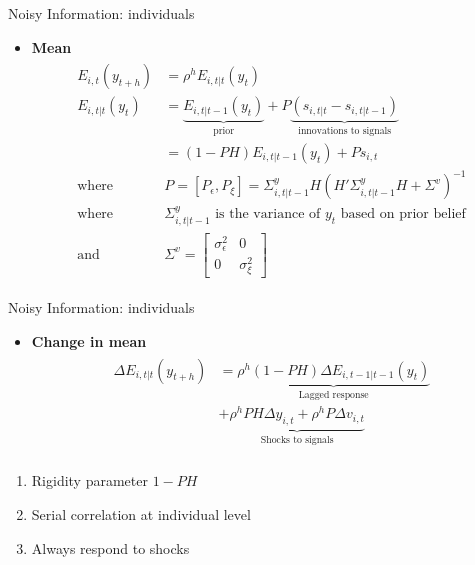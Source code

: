 \documentclass{beamer}
\begin{document}
\begin{frame}{Noisy Information: individuals}
\begin{itemize}
	\item \textbf{Mean}
	\begin{eqnarray*}
		\begin{aligned}
			E_{i,t}(y_{t+h}) & = \rho^{h}E_{i,t|t}(y_{t}) \\
			E_{i,t|t}(y_{t}) 
			& =  \underbrace{E_{i,t|t-1}(y_{t})}_{\text{prior}} + P \underbrace {(s_{i,t|t}-s_{i,t|t-1})}_{\text{innovations to signals}} \\
			& = (1-PH) E_{i,t|t-1}(y_{t}) + Ps_{i,t} \\
			\text{where }  & P = [P_\epsilon,P_\xi]= \Sigma^y_{i,t|t-1} H(H'\Sigma^y_{i,t|t-1} H + \Sigma^v)^{-1} \\
			\text {where } & \Sigma^y_{i,t|t-1} \text{ is the variance of } y_t \text{ based on prior belief}\\
			\text {and } & \Sigma^v =  \left[ \begin{matrix} 
				\sigma^2_{\epsilon} &  0 \\ 0 & \sigma^2_\xi \end{matrix}\right] 
		\end{aligned}
	\end{eqnarray*}
\end{itemize}
\end{frame}

\begin{frame}{Noisy Information: individuals}
\begin{itemize}
\item \textbf{Change in mean}
\begin{eqnarray*}
	\begin{aligned}
		\Delta E_{i,t|t}(y_{t+h}) & = \underbrace{\rho^h (1-PH)\Delta E_{i,t-1|t-1}(y_{t})}_{\text{Lagged response}} \\
		& + \underbrace{\rho^hPH \Delta y_{i,t} + \rho^h P\Delta v_{i,t}}_{\text{Shocks to signals}}\\
	\end{aligned}
\end{eqnarray*}
\end{itemize}

\begin{enumerate}
	\item Rigidity parameter $1-PH$
	\item Serial correlation at individual level 
	\item Always respond to shocks 
\end{enumerate}

\end{frame}
\end{document}
